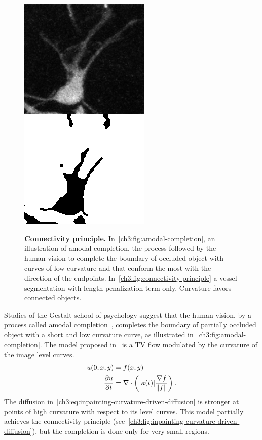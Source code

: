 \begin{figure}
{\includegraphics[scale=0.45]{figures/chapter3/vessels-bad-seg.png}
}
\caption{\textbf{Connectivity principle.} In~\cref{ch3:fig:amodal-completion}, an illustration of amodal completion, the process followed by the human vision to complete the boundary of occluded object with curves of low curvature and that conform the most with the direction of the endpoints. In~\cref{ch3:fig:connectivity-principle} a vessel segmentation with length penalization term only. Curvature favors connected objects.}
\end{figure}

Studies of the Gestalt school of psychology suggest that the human vision, by a process called amodal completion~\cite{mumford94elastica}, completes the boundary of partially occluded object with a short and low curvature curve, as illustrated in~\cref{ch3:fig:amodal-completion}. The model proposed in~\cite{chan01nontexture} is a TV flow modulated by the curvature of the image level curves. 
\begin{align}
	u(0,x,y) &= f(x,y) \nonumber \\
	\frac{\partial u}{\partial t} &= \nabla \cdot \left( |\kappa(t)|\frac{\nabla f}{\lVert f\rVert} \right) .
	\label{ch3:eq:inpainting-curvature-driven-diffusion}
\end{align}
%
The diffusion in~\cref{ch3:eq:inpainting-curvature-driven-diffusion} is stronger at points of high curvature with respect to its level curves. This model partially achieves the connectivity principle (see~\cref{ch3:fig:inpainting-curvature-driven-diffusion}), but the completion is done only for very small regions. 

